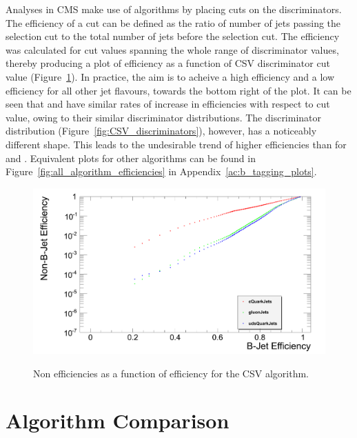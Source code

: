 Analyses in CMS make use of \btagging algorithms by placing cuts on the discriminators. The efficiency of a
cut can be defined as the ratio of number of jets passing the selection cut to the total number of jets before
the selection cut. The efficiency was calculated for cut values spanning the whole range of discriminator
values, thereby producing a plot of \btag efficiency as a function of CSV discriminator cut value
(Figure~\ref{fig:CSV_jet_efficiencies}). In practice, the aim is to acheive a high \bjet efficiency and a low
efficiency for all other jet flavours, \ie towards the bottom right of the plot. It can be seen that \udsjets
and \gjets have similar rates of increase in efficiencies with respect to cut value, owing to their similar
discriminator distributions. The \cjet discriminator distribution (Figure~\ref{fig:CSV_discriminators}),
however, has a noticeably different shape. This leads to the undesirable trend of higher \cjet efficiencies
than for \udsjets and \gjets. Equivalent plots for other algorithms can be found in
Figure~\ref{fig:all_algorithm_efficiencies} in Appendix~\ref{ac:b_tagging_plots}.

\begin{figure}[hbtp]
   \centering
     \includegraphics[width=\textwidth]{Chapters/04_Analysis/04a_BTags/Images/CombinedSecondaryVertex_nonBJetEfficiency_v_bJetEfficiency}\\
     \caption[Non \bjet efficiencies as a function of \bjet efficiency for the CSV algorithm.]{Non \bjet
     efficiencies as a function of \bjet efficiency for the CSV algorithm.}
     \label{fig:CSV_jet_efficiencies}
\end{figure}

\section{Algorithm Comparison}
\label{algorithm_comparison}

